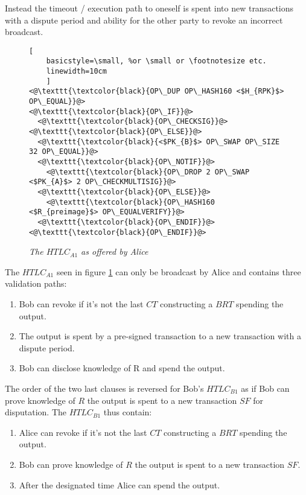 Instead the timeout / execution path to oneself is spent into new transactions with a dispute period and ability for the other party to revoke an incorrect broadcast. 

\begin{figure}[hbt!]

	\centering

	\begin{lstlisting}[
	basicstyle=\small, %or \small or \footnotesize etc.
	linewidth=10cm
	]
<@\texttt{\textcolor{black}{OP\_DUP OP\_HASH160 <$H_{RPK}$> OP\_EQUAL}}@>
<@\texttt{\textcolor{black}{OP\_IF}}@>
  <@\texttt{\textcolor{black}{OP\_CHECKSIG}}@>
<@\texttt{\textcolor{black}{OP\_ELSE}}@>
  <@\texttt{\textcolor{black}{<$PK_{B}$> OP\_SWAP OP\_SIZE 32 OP\_EQUAL}}@>
  <@\texttt{\textcolor{black}{OP\_NOTIF}}@>
    <@\texttt{\textcolor{black}{OP\_DROP 2 OP\_SWAP <$PK_{A}$> 2 OP\_CHECKMULTISIG}}@>  
  <@\texttt{\textcolor{black}{OP\_ELSE}}@> 
    <@\texttt{\textcolor{black}{OP\_HASH160 <$R_{preimage}$> OP\_EQUALVERIFY}}@> 
  <@\texttt{\textcolor{black}{OP\_ENDIF}}@>
<@\texttt{\textcolor{black}{OP\_ENDIF}}@>
	\end{lstlisting}
	
	\caption{\textit{ The $HTLC_{A1}$ as offered by Alice
	}}
	\label{fig:alice:HTLC}
\end{figure}

The $HTLC_{A1}$ seen in figure \ref{fig:alice:HTLC} can only be broadcast by Alice and contains three validation paths:

\begin{enumerate}
	\item Bob can revoke if it's not the last $CT$ constructing a $BRT$ spending the output.
	\item The output is spent by a pre-signed transaction to a new transaction with a dispute period.
	\item Bob can disclose knowledge of R and spend the output.
\end{enumerate}

The order of the two last clauses is reversed for Bob's $HTLC_{B1}$ as if Bob can prove knowledge of $R$ the output is spent to a new transaction $SF$ for disputation.
The $HTLC_{B1}$ thus contain:

\begin{enumerate}
	\item Alice can revoke if it's not the last $CT$ constructing a $BRT$ spending the output.
	\item Bob can prove knowledge of $R$ the output is spent to a new transaction $SF$.
	\item After the designated time Alice can spend the output.
\end{enumerate}

